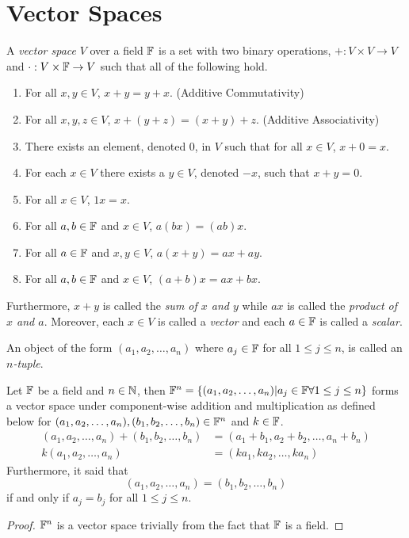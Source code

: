 \section{Vector Spaces}

\begin{definition}
	A \textit{vector space} $V$ over a field $\mathbb{F}$ is a set with two binary operations, $+:V\times V\rightarrow V$ and $\cdot:V\times\mathbb{F}\rightarrow V$ such that all of the following hold.
	\begin{enumerate}
		\item For all $x,y\in V$, $x+y=y+x$. (Additive Commutativity)
		\item For all $x,y,z\in V$, $x+(y+z)=(x+y)+z$. (Additive Associativity)
		\item There exists an element, denoted 0, in $V$ such that for all $x\in V$, $x+0=x$.
		\item For each $x\in V$ there exists a $y\in V$, denoted $-x$, such that $x+y=0$.
		\item For all $x\in V$, $1x=x$.
		\item For all $a,b\in\mathbb{F}$ and $x\in V$, $a(bx)=(ab)x$.
		\item For all $a\in\mathbb{F}$ and $x,y\in V$, $a(x+y)=ax+ay$.
		\item For all $a,b\in\mathbb{F}$ and $x\in V$, $(a+b)x=ax+bx$.
	\end{enumerate}
	Furthermore, $x+y$ is called the \textit{sum of $x$ and $y$} while $ax$ is called the \textit{product of $x$ and $a$}.
	Moreover, each $x\in V$ is called a \textit{vector} and each $a\in\mathbb{F}$ is called a \textit{scalar}.
\end{definition}

\begin{definition}[$n$-tuple]
	An object of the form $(a_1,a_2,\ldots,a_n)$ where $a_j\in\mathbb{F}$ for all $1\leq j\leq n$, is called an \textit{$n$-tuple}.
\end{definition}

\begin{example}
	Let $\mathbb{F}$ be a field and $n\in\mathbb{N}$, then $\mathbb{F}^n=\lbrace (a_1,a_2,\ldots,a_n)| a_j\in\mathbb{F} \forall 1\leq j\leq n \rbrace$ forms a vector space under component-wise addition and multiplication as defined below for $(a_1,a_2,\ldots ,a_n),(b_1,b_2,\ldots,b_n)\in\mathbb{F}^n$ and $k\in\mathbb{F}$.
	\begin{align*}
		(a_1,a_2,\ldots ,a_n)+(b_1,b_2,\ldots,b_n)&=(a_1+b_1,a_2+b_2,\ldots,a_n+b_n)\\
		k(a_1,a_2,\ldots ,a_n)&=(ka_1,ka_2,\ldots,ka_n)
	\end{align*}
	Furthermore, it said that
	\[
		(a_1,a_2,\ldots ,a_n)=(b_1,b_2,\ldots,b_n)
	\]
	if and only if $a_j=b_j$ for all $1\leq j\leq n$.
\end{example}
\begin{proof}
	$\mathbb{F}^n$ is a vector space trivially from the fact that $\mathbb{F}$ is a field.
\end{proof}

